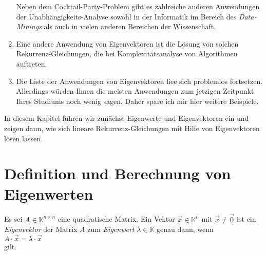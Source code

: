 \begin{enumerate}
      Neben dem Cocktail-Party-Problem gibt es zahlreiche anderen Anwendungen der
      Unabh\"angigkeits-Analyse sowohl in der Informatik im Bereich des 
      \emph{Data-Minings} als auch in vielen anderen Bereichen der Wissenschaft.
\item Eine andere Anwendung von Eigenvektoren ist die L\"osung von
      solchen Rekurrenz-Gleichungen, die bei Komplexit\"atsanalyse von Algorithmen auftreten.
\item Die Liste der Anwendungen von Eigenvektoren lie\3e sich problemlos fortsetzen.  Allerdings
      w\"urden Ihnen die meisten Anwendungen zum jetzigen Zeitpunkt Ihres Studiums noch wenig sagen.
      Daher spare ich mir hier weitere Beispiele.
\end{enumerate}
In diesem Kapitel f\"uhren wir zun\"achst Eigenwerte und Eigenvektoren ein und zeigen dann, wie sich 
lineare Rekurrenz-Gleichungen mit Hilfe von Eigenvektoren l\"osen lassen.  
\pagebreak

\section{Definition und Berechnung von Eigenwerten}
\begin{Definition}[Eigenwert]
Es sei $A \in \mathbb{K}^{n \times n}$ eine quadratische Matrix.  Ein Vektor $\vec{x} \in \mathbb{K}^n$ mit $\vec{x} \not=\vec{0}$
ist ein \emph{Eigenvektor} der Matrix $A$ zum \emph{Eigenwert} $\lambda \in \mathbb{K}$ genau dann, wenn  
\\[0.2cm]
\hspace*{1.3cm}
$A \cdot \vec{x} = \lambda \cdot \vec{x}$
\\[0.2cm]
gilt.  \eoxs
\end{Definition}

